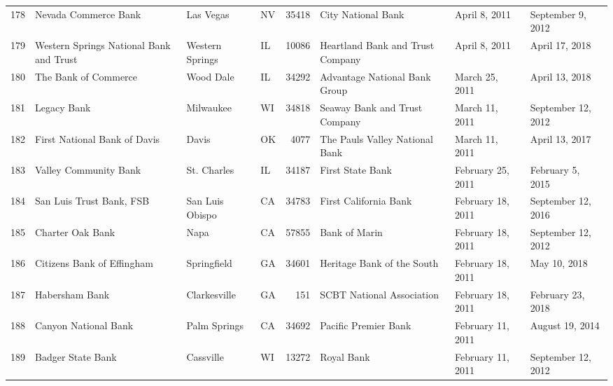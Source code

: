 \begin{tabular}{llllrlll}
178 &                               Nevada Commerce Bank &           Las Vegas &  NV &  35418 &                                 City National Bank &       April 8, 2011 &   September 9, 2012 \\
179 &            Western Springs National Bank and Trust &     Western Springs &  IL &  10086 &                   Heartland Bank and Trust Company &       April 8, 2011 &      April 17, 2018 \\
180 &                               The Bank of Commerce &           Wood Dale &  IL &  34292 &                      Advantage National Bank Group &      March 25, 2011 &      April 13, 2018 \\
181 &                                        Legacy Bank &           Milwaukee &  WI &  34818 &                      Seaway Bank and Trust Company &      March 11, 2011 &  September 12, 2012 \\
182 &                       First National Bank of Davis &               Davis &  OK &   4077 &                     The Pauls Valley National Bank &      March 11, 2011 &      April 13, 2017 \\
183 &                              Valley Community Bank &         St. Charles &  IL &  34187 &                                   First State Bank &   February 25, 2011 &    February 5, 2015 \\
184 &                           San Luis Trust Bank, FSB &     San Luis Obispo &  CA &  34783 &                              First California Bank &   February 18, 2011 &  September 12, 2016 \\
185 &                                   Charter Oak Bank &                Napa &  CA &  57855 &                                      Bank of Marin &   February 18, 2011 &  September 12, 2012 \\
186 &                         Citizens Bank of Effingham &         Springfield &  GA &  34601 &                         Heritage Bank of the South &   February 18, 2011 &        May 10, 2018 \\
187 &                                     Habersham Bank &        Clarkesville &  GA &    151 &                          SCBT National Association &   February 18, 2011 &   February 23, 2018 \\
188 &                               Canyon National Bank &        Palm Springs &  CA &  34692 &                               Pacific Premier Bank &   February 11, 2011 &     August 19, 2014 \\
189 &                                  Badger State Bank &           Cassville &  WI &  13272 &                                         Royal Bank &   February 11, 2011 &  September 12, 2012 \\

\end{tabular}
